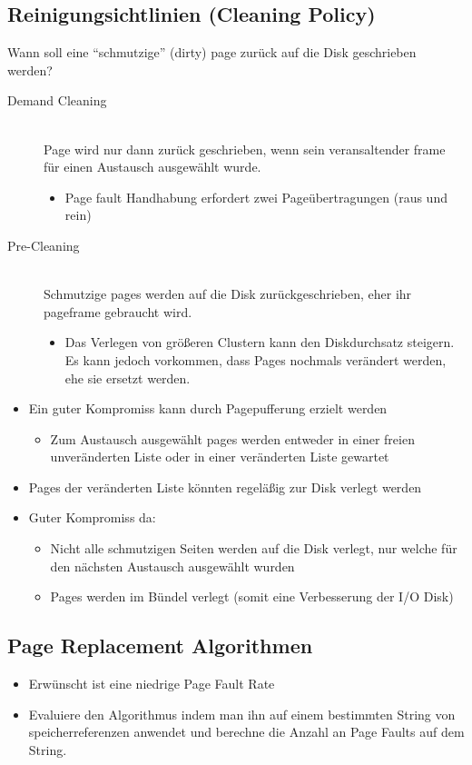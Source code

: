 \documentclass[a4paper]{scrreprt}
\begin{document}
\subsection{Reinigungsichtlinien (Cleaning Policy)}
Wann soll eine "`schmutzige"' (dirty) page zurück auf die Disk geschrieben werden?
\begin{description}
\item[Demand Cleaning]\ \\ Page wird nur dann zurück geschrieben, wenn sein veransaltender frame für einen Austausch ausgewählt wurde.
\begin{itemize}
\item Page fault Handhabung erfordert zwei Pageübertragungen (raus und rein)
\end{itemize}
\item[Pre-Cleaning]\ \\ Schmutzige pages werden auf die Disk zurückgeschrieben, eher ihr pageframe gebraucht wird.
\begin{itemize}
\item Das Verlegen von größeren Clustern kann den Diskdurchsatz steigern. Es kann jedoch vorkommen, dass Pages nochmals verändert werden, ehe sie ersetzt werden.
\end{itemize}
\end{description}
\begin{itemize}
\item Ein guter Kompromiss kann durch Pagepufferung erzielt werden
\begin{itemize}
\item Zum Austausch ausgewählt pages werden entweder in einer freien unveränderten Liste oder in einer veränderten Liste gewartet
\end{itemize}
\item Pages der veränderten Liste könnten regeläßig zur Disk verlegt werden
\item Guter Kompromiss da:
\begin{itemize}
\item Nicht alle schmutzigen Seiten werden auf die Disk verlegt, nur welche für den nächsten Austausch ausgewählt wurden
\item Pages werden im Bündel verlegt (somit eine Verbesserung der I/O Disk)
\end{itemize}
\end{itemize}

\subsection{Page Replacement Algorithmen}
\begin{itemize}
\item Erwünscht ist eine niedrige Page Fault Rate
\item Evaluiere den Algorithmus indem man ihn auf einem bestimmten String von speicherreferenzen anwendet und berechne die Anzahl an Page Faults auf dem String.
\end{itemize}
\newpage
\end{document}
